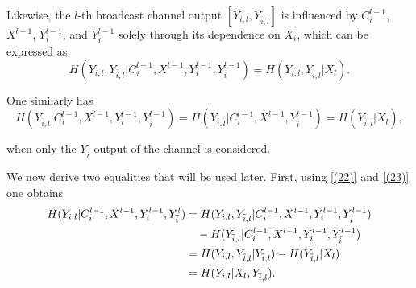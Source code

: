 \documentclass[runningheads]{llncs}
\newcommand{\parbreak}{ \vspace{0.3 em}}
\begin{document}
Likewise, the $l$-th broadcast channel output $[Y_{i,l}, Y_{\overline{i},l}]$ is influenced by $C_i^{l-1}$, $X^{l-1}$, $Y_i^{l-1}$, and $Y_{\overline{i}}^{l-1}$ solely through its dependence on $X_i$, which can be expressed as
\begin{equation}\label{(22)}
H(Y_{i,l}, Y_{\overline{i},l} | C_i^{l-1}, X^{l-1}, Y_i^{l-1}, Y_{\overline{i}}^{l-1}) 
= H(Y_{i,l}, Y_{\overline{i},l} | X_l). 
\end{equation}

One similarly has
\begin{equation}\label{(23)}
H(Y_{\overline{i},l} | C_i^{l-1}, X^{l-1}, Y_i^{l-1}, Y_{\overline{i}}^{l-1})  = H(Y_{\overline{i},l} | C_i^{l-1}, X^{l-1}, Y_{\overline{i}}^{l-1}) 
= H(Y_{\overline{i},l} | X_l), 
\end{equation}

when only the $Y_{\overline{i}}$-output of the channel is considered.  

\parbreak We now derive two equalities that will be used later.  
First, using \eqref{(22)} and \eqref{(23)} one obtains
\begin{align}\label{(24)}
H(Y_{i,l} | C_i^{l-1}, X^{l-1}, Y_i^{l-1}, Y_{\overline{i}}^l) 
& = H(Y_{i,l}, Y_{\overline{i},l} | C_i^{l-1}, X^{l-1}, Y_i^{l-1}, Y_{\overline{i}}^{l-1}) \notag \\
&\quad - H(Y_{\overline{i},l} | C_i^{l-1}, X^{l-1}, Y_i^{l-1}, Y_{\overline{i}}^{l-1}) \notag \\
& = H(Y_{i,l}, Y_{\overline{i},l} | Y_{\overline{i},l}) - H(Y_{\overline{i},l}| X_l) \notag \\
& = H(Y_{i,l} | X_l, Y_{\overline{i},l}).
\end{align}
\end{document}
